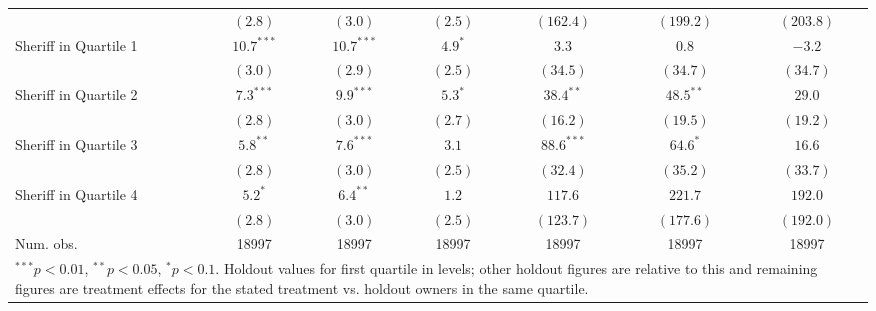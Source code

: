 \begin{table}[htb]
\begin{center}
\begin{tabular}{l c c c c c c }
                      & $(2.8)$       & $(3.0)$       & $(2.5)$      & $(162.4)$     & $(199.2)$      & $(203.8)$      \\
Sheriff in Quartile 1 & $10.7^{***}$  & $10.7^{***}$  & $4.9^{*}$    & $3.3$         & $0.8$          & $-3.2$         \\
                      & $(3.0)$       & $(2.9)$       & $(2.5)$      & $(34.5)$      & $(34.7)$       & $(34.7)$       \\
Sheriff in Quartile 2 & $7.3^{***}$   & $9.9^{***}$   & $5.3^{*}$    & $38.4^{**}$   & $48.5^{**}$    & $29.0$         \\
                      & $(2.8)$       & $(3.0)$       & $(2.7)$      & $(16.2)$      & $(19.5)$       & $(19.2)$       \\
Sheriff in Quartile 3 & $5.8^{**}$    & $7.6^{***}$   & $3.1$        & $88.6^{***}$  & $64.6^{*}$     & $16.6$         \\
                      & $(2.8)$       & $(3.0)$       & $(2.5)$      & $(32.4)$      & $(35.2)$       & $(33.7)$       \\
Sheriff in Quartile 4 & $5.2^{*}$     & $6.4^{**}$    & $1.2$        & $117.6$       & $221.7$        & $192.0$        \\
                      & $(2.8)$       & $(3.0)$       & $(2.5)$      & $(123.7)$     & $(177.6)$      & $(192.0)$      \\
\hline
Num. obs.             & 18997         & 18997         & 18997        & 18997         & 18997          & 18997          \\
\hline
\multicolumn{7}{l}{\scriptsize{\parbox{.75\linewidth}{$^{***}p<0.01$, $^{**}p<0.05$, $^*p<0.1$. Holdout values for first quartile in levels; other holdout figures are relative to this and remaining figures are treatment effects for the stated treatment vs. holdout owners in the same quartile.}}}
\end{tabular}
\label{tbl:lpm_hetero}
\end{center}
\end{table}
